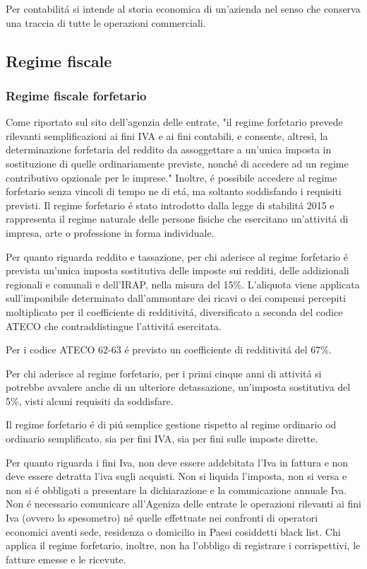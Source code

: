 \documentclass{article}
\begin{document}
Per contabilit\'a si intende al storia economica di un'azienda nel senso che conserva una traccia di tutte le operazioni commerciali.

\subsection{Regime fiscale}

\subsubsection{Regime fiscale forfetario}
Come riportato sul sito dell'agenzia delle entrate, "il regime forfetario prevede rilevanti semplificazioni ai fini IVA e ai fini contabili, e consente, altresì, la determinazione forfetaria del reddito da assoggettare a un’unica imposta in sostituzione di quelle ordinariamente previste, nonché di accedere ad un regime contributivo opzionale per le imprese."
Inoltre, \'e possibile accedere al regime forfetario senza vincoli di tempo ne di et\'a, ma soltanto soddisfando i requisiti previsti.
Il regime forfetario \'e stato introdotto dalla legge di stabilit\'a 2015 e rappresenta il regime naturale delle persone fisiche che esercitano un'attivit\'a di impresa, arte o professione in forma individuale.

Per quanto riguarda reddito e tassazione, per chi aderisce al regime forfetario \'e prevista un'unica imposta sostitutiva delle imposte sui redditi, delle addizionali regionali e comunali e dell'IRAP, nella misura del 15\%. 
L'aliquota viene applicata sull'imponibile determinato dall'ammontare dei ricavi o dei compensi percepiti moltiplicato per il coefficiente di redditivit\'a, diversificato a seconda del codice ATECO che contraddistingue l'attivit\'a esercitata.

Per i codice ATECO 62-63 \'e previsto un coefficiente di redditivit\'a del 67\%.

Per chi aderisce al regime forfetario, per i primi cinque anni di attivit\'a si potrebbe avvalere anche di un ulteriore detassazione, un'imposta sostitutiva del 5\%, visti alcuni requisiti da soddisfare.

Il regime forfetario \'e di pi\'u semplice gestione rispetto al regime ordinario od ordinario semplificato, sia per fini IVA, sia per fini sulle imposte dirette. 

Per quanto riguarda i fini Iva, non deve essere addebitata l'Iva in fattura e non deve essere detratta l'iva sugli acquisti. Non si liquida l'imposta, non si versa e non si \'e obbligati a presentare la dichiarazione e la comunicazione annuale Iva. 
Non \'e necessario comunicare all'Ageniza delle entrate le operazioni rilevanti ai fini Iva (ovvero lo spesometro) né quelle effettuate nei confronti di operatori economici aventi sede, residenza o domicilio in Paesi cosiddetti black list. Chi applica il regime forfetario, inoltre, non ha l'obbligo di registrare i corrispettivi, le fatture emesse e le ricevute.
\end{document}
